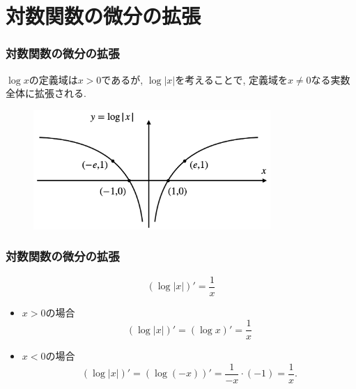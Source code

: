 

\section{対数関数の微分の拡張}

\begin{frame}
\frametitle{対数関数の微分の拡張}

$\log x$の定義域は$x>0$であるが, $\log |x|$を考えることで, 定義域を$x\neq 0$なる実数全体に拡張される. 

 \begin{figure}[htbp]
 \begin{center} 
  \includegraphics[width=90mm]{calculus5/log_abs.png}
 \end{center}
\end{figure}


\end{frame}




\begin{frame}
\frametitle{対数関数の微分の拡張}


\begin{Thm} 
$$(\log |x|)'=\frac{1}{x}$$
\end{Thm}

\begin{itemize}
\item $x>0$の場合
$$
(\log |x|)' = (\log x)'=\frac{1}{x}
$$
\item $x<0$の場合
$$
(\log |x|)' = (\log (-x))'=\frac{1}{-x} \cdot (-1)=\frac{1}{x}. 
$$
\end{itemize}


\end{frame}


